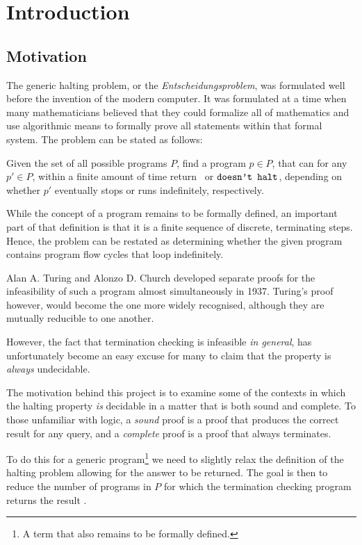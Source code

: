 \chapter{Introduction}\label{section:introduction}

\section{Motivation}

The generic halting problem, or the \emph{Entscheidungsproblem}, was formulated
well before the invention of the modern computer. It was formulated at a time
when many mathematicians believed that they could formalize all of mathematics
and use algorithmic means to formally prove all statements within that formal
system. The problem can be stated as follows:

\begin{definition} Given the set of all possible programs $P$, find a program
$p\in P$, that can for any $p'\in P$,  within a finite amount of time return
\ or $\text{{\ttfamily doesn't halt}}$, depending on whether $p'$
eventually stops or runs indefinitely, respectively.\end{definition}
 
While the concept of a program remains to be formally defined, an important
part of that definition is that it is a finite sequence of discrete,
terminating steps. Hence, the problem can be restated as determining whether
the given program contains program flow cycles that loop indefinitely.

Alan A. Turing and Alonzo D. Church developed separate proofs for the
infeasibility of such a program almost simultaneously in 1937. Turing's proof
however, would become the one more widely recognised, although they are
mutually reducible to one another.

However, the fact that termination checking is infeasible \emph{in general},
has unfortunately become an easy excuse for many to claim that the property is
\emph{always} undecidable. 

The motivation behind this project is to examine some of the contexts in which
the halting property \emph{is} decidable in a matter that is both sound and
complete. To those unfamiliar with logic, a \emph{sound} proof is a proof that
produces the correct result for any query, and a \emph{complete} proof is a
proof that always terminates.

To do this for a generic program\footnote{A term that also remains to be
formally defined.} we need to slightly relax the definition of the halting
problem allowing for the answer  to be returned. The goal is then
to reduce the number of programs in $P$ for which the termination checking
program returns the result .

